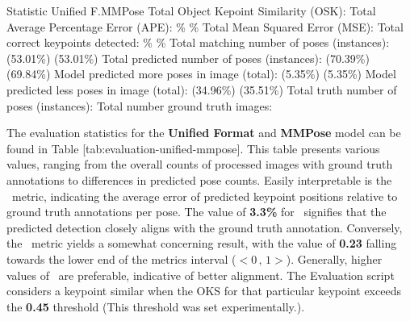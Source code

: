     \setupTABLE[r][1][style=bold]
    \setupTABLE[c][each][offset=3dd]
    \setupTABLE[frame=off]
    \setupTABLE[r][1][topframe=on,bottomframe=on]
    \setupTABLE[c][each][leftframe=on]
    \setupTABLE[c][1][leftframe=off]
    \setupTABLE[c][2,3][align=middle]
    \bTR\bTD Statistic                                   \eTD\bTD    Unified F.\eTD\bTD       MMPose\eTD\eTR
    \bTR\bTD Total Object Kepoint Similarity (OSK):      \eTD{} \eTD{} \eTD\eTR
    \bTR\bTD Total Average Percentage Error (APE):       \eTD{}\% \eTD{}\% \eTD\eTR
    \bTR\bTD Total Mean Squared Error (MSE):             \eTD{} \eTD{} \eTD\eTR
    \bTR\bTD Total correct keypoints detected:           \eTD{}\% \eTD{}\% \eTD\eTR
    \bTR\bTD Total matching number of poses (instances): \eTD{} (53.01\%) \eTD{} (53.01\%) \eTD\eTR
    \bTR\bTD Total predicted number of poses (instances):\eTD{} (70.39\%) \eTD{} (69.84\%) \eTD\eTR
    \bTR\bTD Model predicted more poses in image (total):\eTD{} (5.35\%)\eTD{} (5.35\%) \eTD\eTR
    \bTR\bTD Model predicted less poses in image (total):\eTD{} (34.96\%)\eTD{} (35.51\%) \eTD\eTR
    \bTR\bTD Total truth number of poses (instances):    \eTD{} \eTD{} \eTD\eTR
    \bTR\bTD Total number ground truth images:           \eTD{} \eTD{} \eTD\eTR

The evaluation statistics for the {\bf Unified Format} and {\bf MMPose} model can be found in Table [tab:evaluation-unified-mmpose]. This table presents various values, ranging from the overall counts of processed images with ground truth annotations to differences in predicted pose counts. Easily interpretable is the \APE\ metric, indicating the average error of predicted keypoint positions relative to ground truth annotations per pose. The value of {\bf 3.3\%} for \APE\ signifies that the predicted detection closely aligns with the ground truth annotation. Conversely, the \OKS\ metric yields a somewhat concerning result, with the value of {\bf 0.23} falling towards the lower end of the metrics interval ($ <0\,,\,1> $). Generally, higher values of \OKS\ are preferable, indicative of better alignment. The Evaluation script considers a keypoint similar when the OKS for that particular keypoint exceeds the {\bf 0.45} threshold (This threshold was set experimentally.).

